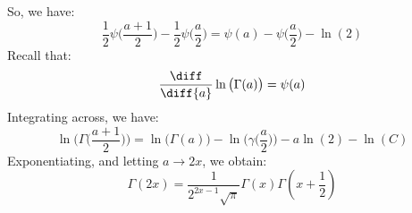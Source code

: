 \documentclass[crop=false,class=book,oneside]{standalone}
\begin{document}
        So, we have:
        \begin{equation}
            \frac{1}{2}\psi\big(\frac{a+1}{2}\big)-
            \frac{1}{2}\psi\big(\frac{a}{2}\big)=
            \psi(a)-\psi\big(\frac{a}{2}\big)-\ln(2)
        \end{equation}
        Recall that:
        \begin{equation}
            \frac{\diff}{\diff{a}}\ln\big(\Gamma(a)\big)=
            \psi(a)
        \end{equation}
        Integrating across, we have:
        \begin{equation}
            \ln\Big(\Gamma\big(\frac{a+1}{2}\big)\Big)
            =\ln\big(\Gamma(a)\big)-
            \ln\Big(\gamma\big(\frac{a}{2}\big)\Big)-
            a\ln(2)-\ln(C)
        \end{equation}
        Exponentiating, and letting $a\rightarrow{2x}$, we obtain:
        \begin{equation}
            \Gamma(2x)=\frac{1}{2^{2x-1}\sqrt{\pi}}
            \Gamma(x)\Gamma(x+\frac{1}{2})
        \end{equation}
\end{document}
